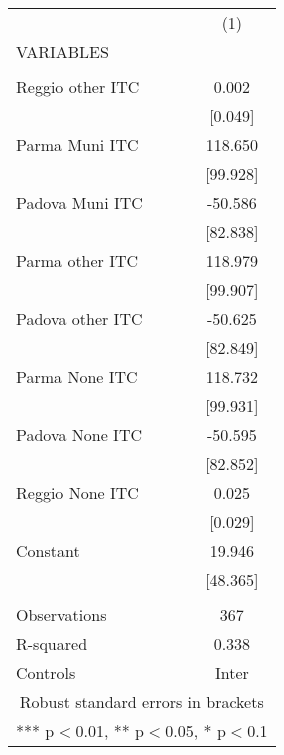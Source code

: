 \begin{tabular}{lc} \hline
 & (1) \\
VARIABLES &  \\ \hline
 &  \\
Reggio other ITC & 0.002 \\
 & [0.049] \\
Parma Muni ITC & 118.650 \\
 & [99.928] \\
Padova Muni ITC & -50.586 \\
 & [82.838] \\
Parma other ITC & 118.979 \\
 & [99.907] \\
Padova other ITC & -50.625 \\
 & [82.849] \\
Parma None ITC & 118.732 \\
 & [99.931] \\
Padova None ITC & -50.595 \\
 & [82.852] \\
Reggio None ITC & 0.025 \\
 & [0.029] \\
Constant & 19.946 \\
 & [48.365] \\
 &  \\
Observations & 367 \\
R-squared & 0.338 \\
 Controls & Inter \\ \hline
\multicolumn{2}{c}{ Robust standard errors in brackets} \\
\multicolumn{2}{c}{ *** p$<$0.01, ** p$<$0.05, * p$<$0.1} \\
\end{tabular}
